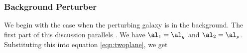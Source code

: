 \subsubsection{Background Perturber}
\label{sec:background}
We begin with the case when the perturbing galaxy is in the background. The first part of this discussion parallels \citet{Keeton03}.  We have $\al_1 = \al_g$ and $\al_2 = \al_p$. Substituting this into equation \ref{eqn:twoplane}, we get